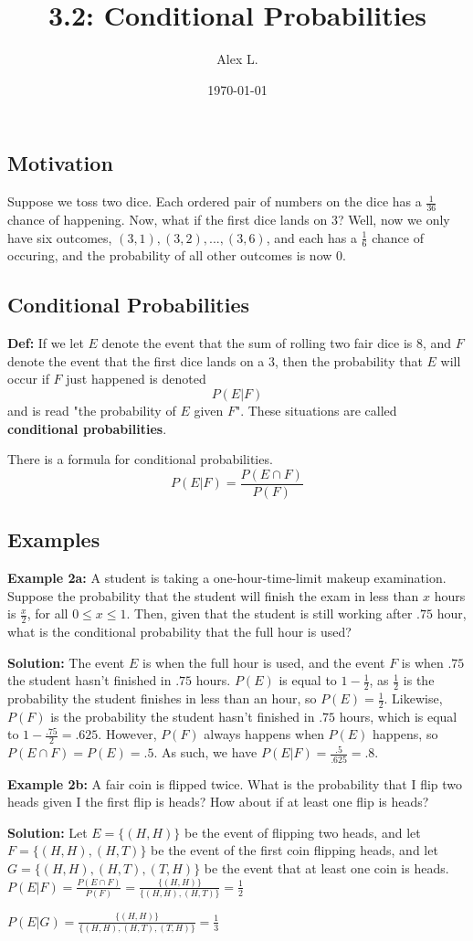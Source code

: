 \documentclass{article}
\title{3.2: Conditional Probabilities}
\author{Alex L.}
\date{\today}
\begin{document}
\maketitle
\subsection{Motivation}

Suppose we toss two dice. Each ordered pair of numbers on the dice has a $\frac{1}{36}$ chance of happening. Now, what if the first dice lands on $3$? Well, now we only have six outcomes, $(3,1),(3,2),...,(3,6)$, and each has a $\frac{1}{6}$ chance of occuring, and the probability of all other outcomes is now $0$. 

\subsection{Conditional Probabilities}

\textbf{Def:} If we let $E$ denote the event that the sum of rolling two fair dice is $8$, and $F$ denote the event that the first dice lands on a $3$, then the probability that $E$ will occur if $F$ just happened is denoted $$P(E \vert F)$$and is read "the probability of $E$ given $F$". These situations are called \textbf{conditional probabilities}.  

There is a formula for conditional probabilities.$$P(E\vert F) = \frac{P(E \cap F)}{P(F)}$$

\subsection{Examples}

\textbf{Example 2a:} A student is taking a one-hour-time-limit makeup examination. Suppose the probability that the student will finish the exam in less than $x$ hours is $\frac{x}{2}$, for all $0 \leq x\leq 1$. Then, given that the student is still working after $.75$ hour, what is the conditional probability that the full hour is used?

\textbf{Solution:} The event $E$ is when the full hour is used, and the event $F$ is when $.75$ the student hasn't finished in $.75$ hours. $P(E)$ is equal to $1-\frac{1}{2}$, as $\frac{1}{2}$ is the probability the student finishes in less than an hour, so $P(E) = \frac{1}{2}$. Likewise, $P(F)$ is the probability the student hasn't finished in $.75$ hours, which is equal to $1 - \frac{.75}{2} = .625$. However, $P(F)$ always happens when $P(E)$ happens, so $P(E \cap F) = P(E) = .5$. As such, we have $P(E\vert F) = \frac{.5}{.625} = .8$.

\textbf{Example 2b:} A fair coin is flipped twice. What is the probability that I flip two heads given I the first flip is heads? How about if at least one flip is heads?

\textbf{Solution:} Let $E = \{(H,H)\}$ be the event of flipping two heads, and let $F = \{(H,H),(H,T)\}$ be the event of the first coin flipping heads, and let $G = \{(H,H),(H,T),(T,H)\}$ be the event that at least one coin is heads. $P(E \vert F) = \frac{P(E \cap F)}{P(F)} = \frac{\{(H,H)\}}{\{(H,H),(H,T)\}} = \frac{1}{2}$

$P(E \vert G) = \frac{\{(H,H)\}}{\{(H,H),(H,T),(T,H)\}} = \frac{1}{3}$
\end{document}
